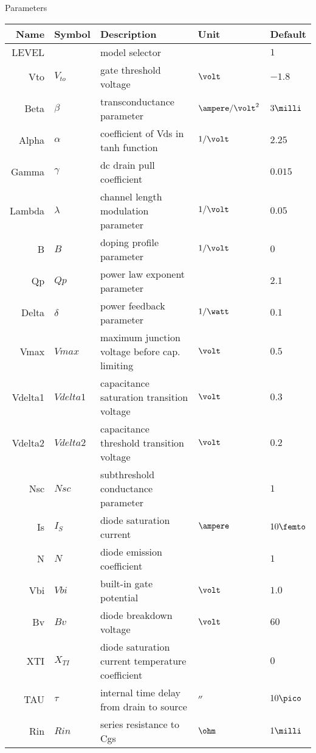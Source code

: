 Parameters
\begin{longtable}{rllll}
Name & Symbol & Description & Unit & Default\\
\hline
\endhead
LEVEL &          & model selector                        &                   & $1$\\
Vto   & $V_{to}$ & gate threshold voltage                & $\volt$           & $-1.8$\\
Beta  & $\beta$  & transconductance parameter            & $\ampere/\volt^2$ & $3\milli$\\
Alpha & $\alpha$ & coefficient of Vds in tanh function   & $1/\volt$         & $2.25$\\
Gamma & $\gamma$ & dc drain pull coefficient             &                   & $0.015$\\
Lambda & $\lambda$ & channel length modulation parameter & $1/\volt$         & $0.05$\\
B      & $B$       & doping profile parameter            & $1/\volt$         & $0$\\
Qp     & $Qp$      & power law exponent parameter       &                   & $2.1$\\
Delta  & $\delta$  & power feedback parameter            & $1/\watt$         & $0.1$\\
Vmax   & $Vmax$    & \parbox[t]{5.5cm}{maximum junction voltage before cap. limiting} & $\volt$ & $0.5$\\
Vdelta1 & $Vdelta1$ & \parbox[t]{5.5cm}{capacitance saturation transition voltage} & $\volt$ & $0.3$\\
Vdelta2 & $Vdelta2$ & \parbox[t]{5.5cm}{capacitance threshold transition voltage}  & $\volt$ & $0.2$\\
Nsc     & $Nsc$     & subthreshold conductance parameter          &          & $1$\\
Is & $I_{S}$ & diode saturation current   & $\ampere$ & $10\femto$\\ 
N  & $N$     & diode emission coefficient &           &  $1$\\
Vbi& $Vbi$   & built-in gate potential   & $\volt$  & $1.0$\\
Bv & $Bv$    & diode breakdown voltage  & $\volt$ & $60$\\
XTI & $X_{TI}$ & \parbox[t]{5.5cm}{diode saturation current temperature coefficient} &   & $0$\\
TAU & $\tau$ & \parbox[t]{5.5cm}{internal time delay from drain to source} & $\second$ & $10\pico$\\
Rin & $Rin$ & series resistance to Cgs & $\ohm$ & $1\milli$\\

\end{longtable}
